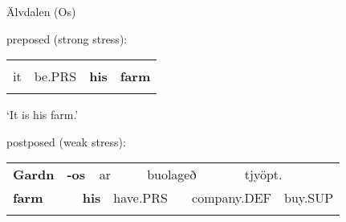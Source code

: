 \begin{listWWNumileveli}
\item 

\begin{styleExample}
Älvdalen (Os)

\end{styleExample}

\end{listWWNumileveli}

\begin{listWWNumlxxxixleveli}
\item 

\begin{styleExLtrTbl}
preposed (strong stress):

\end{styleExLtrTbl}

\end{listWWNumlxxxixleveli}

\begin{tabular}{llll}
\lsptoprule
\multicolumn{4}{l}{Eð

}\\
it & be.PRS & {\bfseries his} & {\bfseries farm}\\
\lspbottomrule
\end{tabular}

\begin{styleTranslation}
‘It is his farm.’

\end{styleTranslation}

\begin{styleExLtrTblii}
postposed (weak stress):

\end{styleExLtrTblii}

\begin{tabular}{llllllllll}
\lsptoprule
{\bfseries Gardn} & \multicolumn{2}{l}{{\bfseries {}-os}

} & \multicolumn{2}{l}{ar

} & \multicolumn{2}{l}{buolageð

} & \multicolumn{2}{l}{tjyöpt.

} & \\
\multicolumn{2}{l}{{\bfseries farm}

} & \multicolumn{2}{l}{{\bfseries his}

} & \multicolumn{2}{l}{have.PRS

} & \multicolumn{2}{l}{company.DEF

} & \multicolumn{2}{l}{buy.SUP

}\\
\lspbottomrule
\end{tabular}

